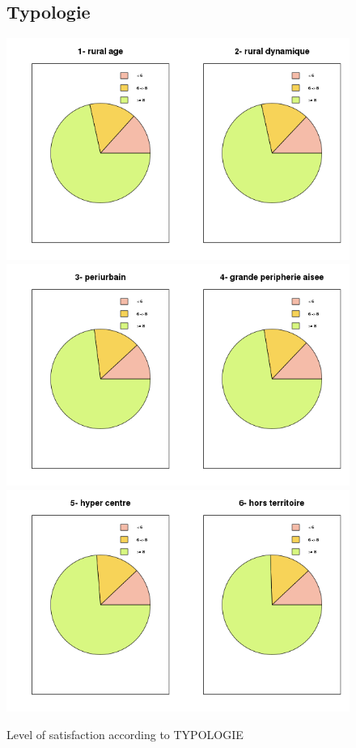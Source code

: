 \documentclass[a4paper, 11pt]{article}
\begin{document}
        \begin{figure}[!ht]
        \subsection{Typologie}
        	\centering
                \includegraphics[width = 10 cm]{Remi/Level_of_satisfaction_according_to_TYPOLOGIE2.png}
                \includegraphics[width = 10 cm]{Remi/Level_of_satisfaction_according_to_TYPOLOGIE4.png}
                \includegraphics[width = 10 cm]{Remi/Level_of_satisfaction_according_to_TYPOLOGIE6.png}
                \caption{Level of satisfaction according to TYPOLOGIE}
                \label{fig:TYPOLOGIE2}
        \end{figure}
\end{document}
